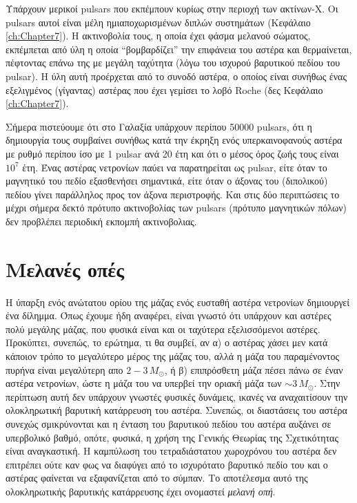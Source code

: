 Υπάρχουν μερικοί pulsars που εκπέμπουν κυρίως στην περιοχή των ακτίνων-X. Οι pulsars αυτοί είναι μέλη ημιαποχωρισμένων διπλών συστημάτων (Κεφάλαιο \ref{ch:Chapter7}). Η ακτινοβολία τους, η οποία έχει φάσμα μελανού σώματος, εκπέμπεται από ύλη η οποία ``βομβαρδίζει'' την επιφάνεια του αστέρα και θερμαίνεται, πέφτοντας επάνω της με μεγάλη ταχύτητα (λόγω του ισχυρού βαρυτικού πεδίου του pulsar). Η ύλη αυτή προέρχεται από το συνοδό αστέρα, ο οποίος είναι συνήθως ένας εξελιγμένος (γίγαντας) αστέρας που έχει γεμίσει το λοβό Roche (δες Κεφάλαιο \ref{ch:Chapter7}).

Σήμερα πιστεύουμε ότι στο Γαλαξία υπάρχουν περίπου 50000 pulsars, ότι η δημιουργία τους συμβαίνει συνήθως κατά την έκρηξη ενός υπερκαινοφανούς αστέρα με ρυθμό περίπου ίσο με 1 pulsar ανά 20 έτη και ότι ο μέσος όρος ζωής τους είναι $10^7$ έτη. Ένας αστέρας νετρονίων παύει να παρατηρείται ως pulsar, είτε όταν το μαγνητικό του πεδίο εξασθενήσει σημαντικά, είτε όταν ο άξονας του (διπολικού) πεδίου γίνει παράλληλος προς τον άξονα περιστροφής. Και στις δύο περιπτώσεις το μέχρι σήμερα δεκτό πρότυπο ακτινοβολίας των pulsars (πρότυπο μαγνητικών πόλων) δεν προβλέπει περιοδική εκπομπή ακτινοβολιας.









\section{Μελανές οπές}
Η ύπαρξη ενός ανώτατου ορίου της μάζας ενός ευσταθή αστέρα νετρονίων δημιουργεί ένα δίλημμα. Όπως έχουμε ήδη αναφέρει, είναι γνωστό ότι υπάρχουν και αστέρες πολύ μεγάλης μάζας, που φυσικά είναι και οι ταχύτερα εξελισσόμενοι αστέρες. Προκύπτει, συνεπώς, το ερώτημα, τι θα συμβεί, αν α) ο αστέρας χάσει μεν κατά κάποιον τρόπο το μεγαλύτερο μέρος της μάζας του, αλλά η μάζα του παραμένοντος πυρήνα είναι μεγαλύτερη απο $2 - 3\,M_\odot$,  ή β) επιπρόσθετη μάζα πέσει πάνω σε έναν αστέρα νετρονίων, ώστε η μάζα του να υπερβεί την οριακή μάζα των $\sim 3\,M_\odot$. Στην περίπτωση αυτή δεν υπάρχουν γνωστές φυσικές δυνάμεις, ικανές να αναχαιτίσουν την ολοκληρωτική βαρυτική κατάρρευση του αστέρα. Συνεπώς, οι διαστάσεις του αστέρα συνεχώς σμικρύνονται και η ένταση του βαρυτικού πεδίου του αστέρα αυξάνει σε υπερβολικό βαθμό, οπότε, φυσικά, η χρήση της Γενικής Θεωρίας της Σχετικότητας είναι αναγκαστική. Η καμπύλωση του τετραδιάστατου χωροχρόνου του αστέρα δεν επιτρέπει ούτε καν φως να διαφύγει από το ισχυρότατο βαρυτικό πεδίο του και ο αστέρας φαίνεται να εξαφανίζεται από το σύμπαν. Το αποτέλεσμα αυτό της ολοκληρωτικής βαρυτικής κατάρρευσης έχει ονομαστεί \textit{μελανή οπή}.

